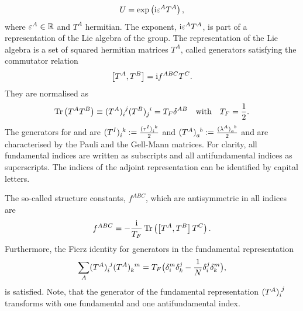 \begin{equation}
	\begin{aligned}
		U = \operatorname{exp} \left( \mathrm{i} \varepsilon^{A} T^{A} \right)
		\text{,}
	\end{aligned}
\end{equation}
where $ \varepsilon^{A} \in \mathbb{R} $ and $ T^{A} $ hermitian. The exponent, $ \mathrm{i} \varepsilon^{A} T^{A} $, is part of a representation of the Lie algebra of the group. The representation of the Lie algebra is a set of squared hermitian matrices $ T^{A} $, called generators satisfying the commutator relation
\begin{equation}
	\begin{aligned}
		\left[T^{A},T^{B}\right]
		=
		\mathrm{i} f^{A B C} T^{C}
		\text{.}
	\end{aligned}
\end{equation}
They are normalised as
\begin{equation}
	\begin{aligned}
		\Tr{T^{A} T^{B}} \equiv \tensor{(T^{A})}{_{i}^{j}} \tensor{(T^{B})}{_{j}^{i}} = T_{F} \delta^{A B}
		\quad
		\text{with}
		\quad
		T_{F} = \frac{1}{2}
		\text{.}
	\end{aligned}
\end{equation}
The generators for  and  are $ \tensor{(T^{I})}{_{i} ^{k}} := \frac{\tensor{(\tau^{I})}{_{i} ^{k}}}{2} $ and $ \tensor{(T^{A})}{_{a} ^{b}} := \frac{\tensor{(\lambda^{A})}{_{a} ^{b}}}{2} $ and are characterised by the Pauli and the Gell-Mann matrices. For clarity, all fundamental indices are written as subscripts and all antifundamental indices as superscripts. The indices of the adjoint representation can be identified by capital letters.\par
The so-called structure constants, $ f^{A B C} $, which are antisymmetric in all indices are
\begin{equation}
	\begin{aligned}
		f^{A B C} = - \frac{\mathrm{i}}{T_{F}} \operatorname{Tr} \left( \left[T^{A}, T^{B}\right] T^{C} \right)
		\text{.}
	\end{aligned} \label{eq:structureconstSUN}
\end{equation}
Furthermore, the Fierz identity for generators in the fundamental representation
\begin{equation}
	\begin{aligned}
		\sum_{A} \tensor{(T^{A})}{_{i} ^{j}} \tensor{(T^{A})}{_{k} ^{m}}
		= T_{F} \big(
		\tensor*{\delta}{_{i} ^{m}} \tensor*{\delta}{_{k} ^{j}}
		- \frac{1}{N} \tensor*{\delta}{_{i} ^{j}} \tensor*{\delta}{_{k} ^{m}}
		\big)
		\text{,}
	\end{aligned}
\end{equation}
is satisfied. Note, that the generator of the fundamental representation $ \tensor{(T^{A})}{_{i} ^{j}} $ transforms with one fundamental and one antifundamental index.\par
%
